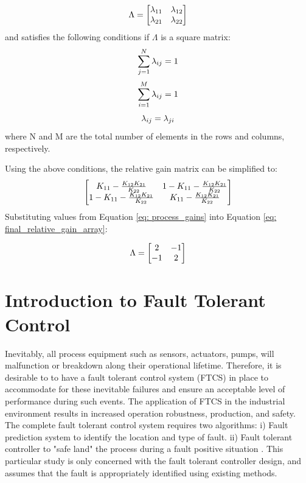 \begin{equation}
    \centering
    \Lambda = 
    \begin{bmatrix}
    \lambda_{11}   &   \lambda_{12}   \\
    \lambda_{21}   &   \lambda_{22}
    \end{bmatrix}
\end{equation}
and satisfies the following conditions if $\Lambda$ is a square matrix:
{
\begin{equation}
    \centering
    \sum_{j = 1}^N \lambda_{ij} = 1
\end{equation}
\begin{equation}
    \centering
    \sum_{i = 1}^M \lambda_{ij} = 1
\end{equation}
\begin{equation}
    \centering
    \lambda_{ij} = \lambda_{ji}
\end{equation}}
where N and M are the total number of elements in the rows and columns, respectively.

Using the above conditions, the relative gain matrix can be simplified to:
\begin{equation}
    \centering
    \begin{bmatrix}
     K_{11} - \frac{K_{12}K_{21}}{K_{22}}   &   1 - K_{11} - \frac{K_{12}K_{21}}{K_{22}}   \\
     1 - K_{11} - \frac{K_{12}K_{21}}{K_{22}}   &   K_{11} - \frac{K_{12}K_{21}}{K_{22}}
    \end{bmatrix}
    \label{eq: final_relative_gain_array}
\end{equation}
Substituting values from Equation \ref{eq: process_gains} into Equation \ref{eq: final_relative_gain_array}:

\begin{equation}
    \centering
    \Lambda = 
    \begin{bmatrix}
     2   &   -1   \\
     -1  &    2
    \end{bmatrix}
    \label{eq: relative_gain_array_w_values}
\end{equation}

\section{Introduction to Fault Tolerant Control}

Inevitably, all process equipment such as sensors, actuators, pumps, will malfunction or breakdown along their operational lifetime. Therefore, it is desirable to to have a fault tolerant control system (FTCS) in place to accommodate for these inevitable failures and ensure an acceptable level of performance during such events. The application of FTCS in the industrial environment results in increased operation robustness, production, and safety. The complete fault tolerant control system requires two algorithms: i) Fault prediction system to identify the location and type of fault. ii) Fault tolerant controller to "safe land" the process during a fault positive situation \cite{process_faults}.  This particular study is only concerned with the fault tolerant controller design, and assumes that the fault is appropriately identified using existing methods.

